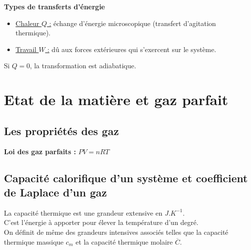 \documentclass[13pt, twoside, a4paper, french]{report}
\begin{document}
                \textbf{Types de transferts d'énergie}
                \vspace{5pt}
                \begin{itemize}
                    \item \underline{Chaleur $Q$ :} échange d'énergie microscopique (transfert d'agitation thermique).
                    \item \underline{Travail $W$ :} dû aux forces extérieures qui s'exercent sur le système.
                \end{itemize}
                \vspace{5pt}
                Si $Q = 0$, la transformation est adiabatique.\\


    \chapter{Etat de la matière et gaz parfait}\label{ch:etat-de-la-matiere-et-gaz-parfait}


        \section{Les propriétés des gaz}\label{sec:les-proprietes-des-gaz}

            \textbf{Loi des gaz parfaits :} $P V = n R T$


        \section{Capacité calorifique d’un système et coefficient de Laplace d’un gaz}\label{sec:capacite-calorifique-dun-systeme-et-coefficient-de-laplace-dun-gaz}

            La capacité thermique est une grandeur extensive en $J.K^{-1}$.\\
            C'est l'énergie à apporter pour élever la température d'un degré.
            \vspace{7pt}\\
            On définit de même des grandeurs intensives associés telles que la capacité thermique massique $c_m$ et la capacité thermique molaire $\overline{C}$.\\
\end{document}
